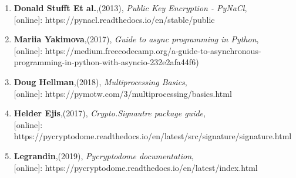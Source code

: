 \begin{enumerate}
    \item \textbf{Donald Stufft Et al.},(2013),
        \textit{Public Key Encryption - PyNaCl},\\
        \hspace{15mm}[online]: https://pynacl.readthedocs.io/en/stable/public

    \item \textbf{Mariia Yakimova},(2017),
        \textit{Guide to async programming in Python},\\
        \hspace{15mm}[online]: https://medium.freecodecamp.org/a-guide-to-asynchronous-programming-in-python-with-asyncio-232e2afa44f6)

    \item \textbf{Doug Hellman},(2018),
        \textit{Multiprocessing Basics},\\
        \hspace{15mm}[online]: https://pymotw.com/3/multiprocessing/basics.html

    \item \textbf{Helder Ejis},(2017),
        \textit{Crypto.Signautre package guide},\\
        \hspace{15mm}[online]: https://pycryptodome.readthedocs.io/en/latest/src/signature/signature.html

    \item \textbf{Legrandin},(2019),
        \textit{Pycryptodome documentation},\\
        \hspace{15mm}[online]: https://pycryptodome.readthedocs.io/en/latest/index.html
\end{enumerate}

\newpage
